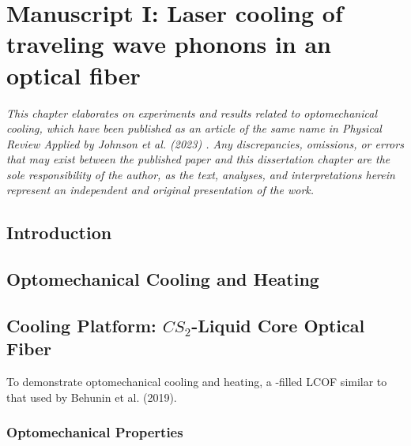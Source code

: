 \setcounter{rownumber}{0}
\chapter{Manuscript I: Laser cooling of traveling wave phonons in an optical fiber}
\label{ch:Cooling}
\acresetall

\textit{This chapter elaborates on experiments and results related to optomechanical cooling, which have been published as an article of the same name in Physical Review Applied by Johnson et al. (2023) \cite{johnson2023laser}. Any discrepancies, omissions, or errors that may exist between the published paper and this dissertation chapter are the sole responsibility of the author, as the text, analyses, and interpretations herein represent an independent and original presentation of the work.}


\section{Introduction}
\label{sec:Cooling:Introduction}




\section{Optomechanical Cooling and Heating}
\label{sec:Cooling:Cooling-Heating}




\section{Cooling Platform: \texorpdfstring{$CS_{2}$}{CS2}-Liquid Core Optical Fiber}
\label{sec:Cooling:Platform}

To demonstrate optomechanical cooling and heating, a -filled \ac{LCOF} similar to that used by Behunin et al. (2019). \cite{behunin2019spontaneous}

\subsection{Optomechanical Properties}
\label{subsec:Cooling:Platform:Properties}


